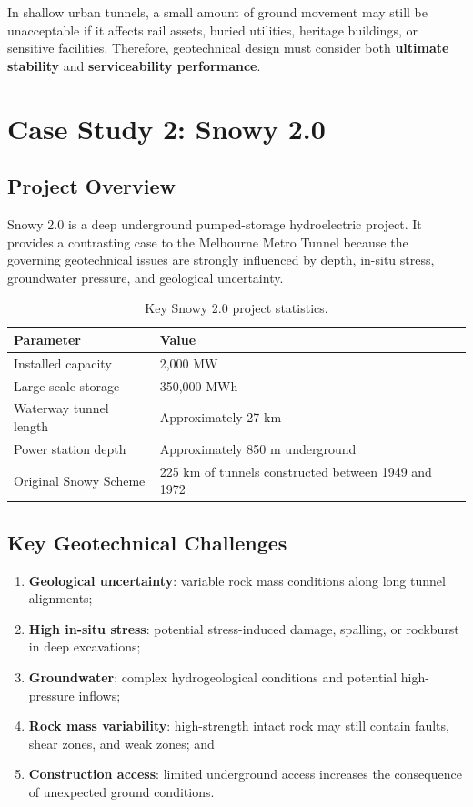 \documentclass[a4paper,12pt]{article}
\begin{document}
\begin{keybox}
In shallow urban tunnels, a small amount of ground movement may still be unacceptable if it affects rail assets, buried utilities, heritage buildings, or sensitive facilities. Therefore, geotechnical design must consider both \textbf{ultimate stability} and \textbf{serviceability performance}.
\end{keybox}

\section{Case Study 2: Snowy 2.0}

\subsection{Project Overview}
Snowy 2.0 is a deep underground pumped-storage hydroelectric project. It provides a contrasting case to the Melbourne Metro Tunnel because the governing geotechnical issues are strongly influenced by depth, in-situ stress, groundwater pressure, and geological uncertainty.

\begin{table}[H]
\centering
\small
\begin{tabularx}{1\textwidth}{X l}
\toprule
\textbf{Parameter} & \textbf{Value} \\
\midrule
Installed capacity & 2,000 MW \\
Large-scale storage & 350,000 MWh \\
Waterway tunnel length & Approximately 27 km \\
Power station depth & Approximately 850 m underground \\
Original Snowy Scheme & 225 km of tunnels constructed between 1949 and 1972 \\
\bottomrule
\end{tabularx}
\caption{Key Snowy 2.0 project statistics.}
\end{table}

\subsection{Key Geotechnical Challenges}
\begin{enumerate}
    \item \textbf{Geological uncertainty}: variable rock mass conditions along long tunnel alignments;
    \item \textbf{High in-situ stress}: potential stress-induced damage, spalling, or rockburst in deep excavations;
    \item \textbf{Groundwater}: complex hydrogeological conditions and potential high-pressure inflows;
    \item \textbf{Rock mass variability}: high-strength intact rock may still contain faults, shear zones, and weak zones; and
    \item \textbf{Construction access}: limited underground access increases the consequence of unexpected ground conditions.
\end{enumerate}
\end{document}
